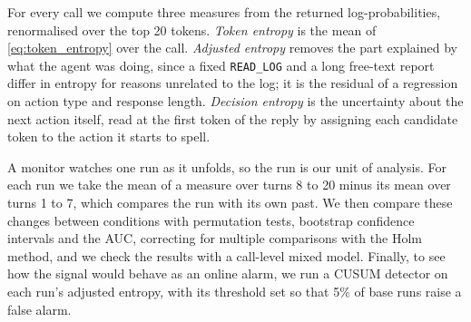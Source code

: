 For every call we compute three measures from the returned log-probabilities, renormalised over the top 20 tokens. \emph{Token entropy} is the mean of \ref{eq:token_entropy} over the call. \emph{Adjusted entropy} removes the part explained by what the agent was doing, since a fixed \texttt{READ\_LOG} and a long free-text report differ in entropy for reasons unrelated to the log; it is the residual of a regression on action type and response length. \emph{Decision entropy} is the uncertainty about the next action itself, read at the first token of the reply by assigning each candidate token to the action it starts to spell.

A monitor watches one run as it unfolds, so the run is our unit of analysis. For each run we take the mean of a measure over turns 8 to 20 minus its mean over turns 1 to 7, which compares the run with its own past. We then compare these changes between conditions with permutation tests, bootstrap confidence intervals and the AUC, correcting for multiple comparisons with the Holm method, and we check the results with a call-level mixed model. Finally, to see how the signal would behave as an online alarm, we run a CUSUM detector \parencite{page1954cusum} on each run's adjusted entropy, with its threshold set so that 5\% of base runs raise a false alarm.
